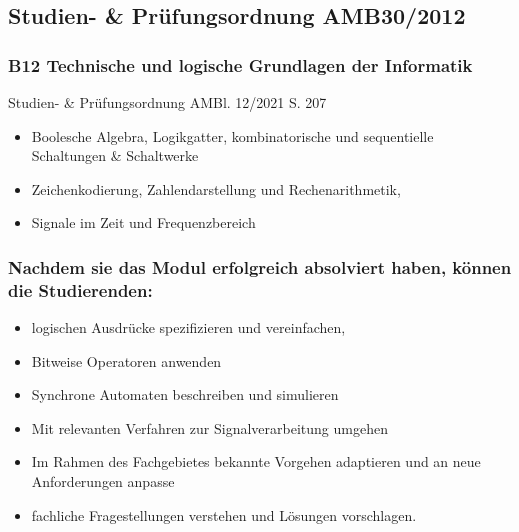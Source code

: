 \documentclass[xcolor=dvipsnames,aspectratio=169]{beamer}
\begin{document}
\subsection{Studien- \& Prüfungsordnung AMB30/2012}
\begin{frame}
	\frametitle{B12 Technische und logische Grundlagen der Informatik}
	Studien- \& Prüfungsordnung AMBl. 12/2021 S. 207\\
	\begin{itemize}
		\item Boolesche Algebra, Logikgatter, kombinatorische und sequentielle Schaltungen \& Schaltwerke
		\item Zeichenkodierung, Zahlendarstellung und Rechenarithmetik,
		\item Signale im Zeit und Frequenzbereich
	\end{itemize}
\end{frame}

\begin{frame}
	\frametitle{Nachdem sie das Modul erfolgreich absolviert haben, können die Studierenden:}
	\vspace{-0.7cm}
	\begin{itemize}
		\item logischen Ausdrücke spezifizieren und vereinfachen, 
		\item Bitweise Operatoren anwenden
		\item Synchrone Automaten beschreiben und simulieren
		\item Mit relevanten Verfahren zur Signalverarbeitung umgehen
		\item Im Rahmen des Fachgebietes bekannte Vorgehen adaptieren und an neue Anforderungen anpasse
		\item fachliche Fragestellungen verstehen und Lösungen vorschlagen. 
	\end{itemize}
\end{frame}
\end{document}
